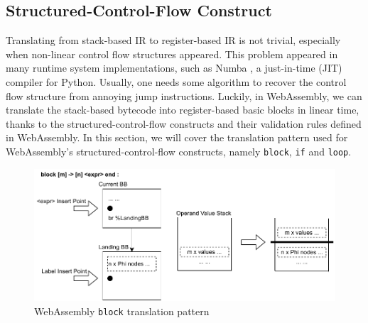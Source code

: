 \subsection{Structured-Control-Flow Construct}

Translating from stack-based IR to register-based IR is not trivial, especially
when non-linear control flow structures appeared. This problem appeared in many
runtime system implementations, such as Numba \cite{numba}, a just-in-time (JIT)
compiler for Python. Usually, one needs some algorithm to recover the control
flow structure from annoying jump instructions. Luckily, in WebAssembly, we can
translate the stack-based bytecode into register-based basic blocks in linear
time, thanks to the structured-control-flow constructs and their validation
rules defined in WebAssembly. In this section, we will cover the translation
pattern used for WebAssembly's structured-control-flow constructs, namely
\texttt{block}, \texttt{if} and \texttt{loop}.

\begin{figure}
  \centering
  \includegraphics[width=\textwidth]{Images/4.MIR/translate-block.pdf}
  \caption{WebAssembly \texttt{block} translation pattern}
  \label{fig:translate-block}
\end{figure}

